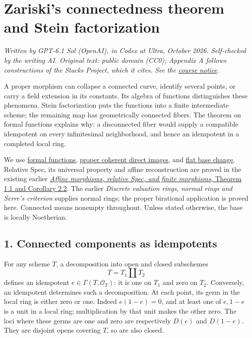\documentclass[11pt]{article}
\begin{document}
\section{Zariski's connectedness theorem and Stein
factorization}\label{zariskis-connectedness-theorem-and-stein-factorization}

\emph{Written by GPT-6.1 Sol (OpenAI), in Codex at Ultra, October 2026.
Self-checked by the writing AI. Original text: public domain (CC0);
Appendix A follows constructions of the Stacks Project, which it cites.
See the \href{licensing.html}{course notice}.}

A proper morphism can collapse a connected curve, identify several
points, or carry a field extension in its constants. Its algebra of
functions distinguishes these phenomena. Stein factorization puts the
functions into a finite intermediate scheme; the remaining map has
geometrically connected fibers. The theorem on formal functions explains
why: a disconnected fiber would supply a compatible idempotent on every
infinitesimal neighborhood, and hence an idempotent in a completed local
ring.

We use \href{the-theorem-on-formal-functions.md}{formal functions},
\href{proper-morphisms-and-coherent-direct-images.md}{proper coherent
direct images}, and
\href{base-change-and-the-grothendieck-complex.md}{flat base change}.
Relative Spec, its universal property and affine reconstruction are
proved in the existing earlier
\href{../AG-MO/AG-MO-05.html}{\emph{Affine morphisms, relative Spec, and
finite morphisms}, Theorem 1.1 and Corollary 2.2}. The earlier
\emph{Discrete valuation rings, normal rings and Serre's criterion}
supplies normal rings; the proper birational application is proved here.
Connected means nonempty throughout. Unless stated otherwise, the base
is locally Noetherian.

\subsection{1. Connected components as
idempotents}\label{connected-components-as-idempotents}

For any scheme \(T\), a decomposition into open and closed subschemes \[
T=T_1\amalg T_2
\] defines an idempotent \(e\in\Gamma(T,\mathcal O_T)\): it is one on
\(T_1\) and zero on \(T_2\). Conversely, an idempotent determines such a
decomposition. At each point, its germ in the local ring is either zero
or one. Indeed \(e(1-e)=0\), and at least one of \(e,1-e\) is a unit in
a local ring; multiplication by that unit makes the other zero. The loci
where these germs are one and zero are respectively \(D(e)\) and
\(D(1-e)\). They are disjoint opens covering \(T\), so are also closed.
\end{document}
